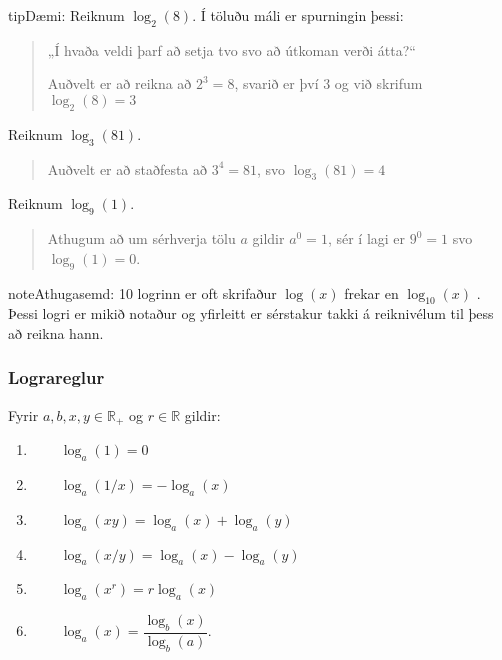 \documentclass[a4paper,10pt,icelandic]{sphinxmanual}
\begin{document}
\begin{sphinxadmonition}{tip}{Dæmi:}
 Reiknum \(\log_2(8)\). Í töluðu máli er spurningin þessi:
\begin{quote}

„Í hvaða veldi þarf að setja tvo svo að útkoman verði átta?“

Auðvelt er að reikna að \(2^3=8\), svarið er því \(3\) og við skrifum
\(\log_2(8)=3\)
\end{quote}

 Reiknum \(\log_3(81)\).
\begin{quote}

Auðvelt er að staðfesta að \(3^4=81\), svo \(\log_3(81)=4\)
\end{quote}

 Reiknum \(\log_9(1)\).
\begin{quote}

Athugum að um sérhverja tölu \(a\) gildir \(a^0=1\), sér í lagi er \(9^0=1\) svo \(\log_9(1)=0\).
\end{quote}
\end{sphinxadmonition}

\begin{sphinxadmonition}{note}{Athugasemd:}
10 \sphinxhyphen{} logrinn er oft skrifaður \(\log(x)\) frekar en \(\log_{10}(x)\) .
Þessi logri er mikið notaður og yfirleitt er sérstakur takki á reiknivélum til þess að reikna hann.
\end{sphinxadmonition}


\subsubsection{Lograreglur}
\label{\detokenize{Kafli09:lograreglur}}
Fyrir \(a,b,x,y\in \mathbb{R}_+\) og \(r \in \mathbb{R}\) gildir:
\begin{enumerate}
%
\item {} 
\(\qquad \log_a(1)=0\)

\item {} 
\(\qquad \log_a(1/x)=-\log_a(x)\)

\item {} 
\(\qquad \log_a(xy)=\log_a(x)+\log_a(y)\)

\item {} 
\(\qquad \log_a(x/y)=\log_a(x)-\log_a(y)\)

\item {} 
\(\qquad \log_a(x^r)=r\log_a(x)\)

\item {} 
\(\qquad \log_a(x)=\dfrac{\log_b(x)}{\log_b(a)}\).

\end{enumerate}
\end{document}
